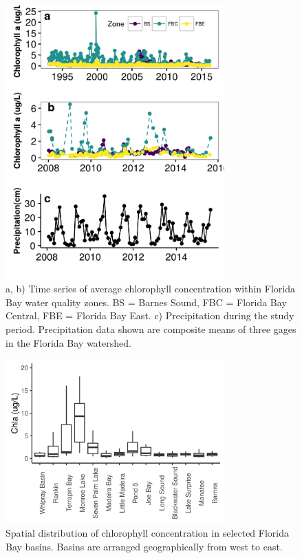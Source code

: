 \newpage

\begin{figure}
  \centering
  \includegraphics[width=0.75\textwidth]{../../figures/chltimeseries.png}
  \caption{a, b) Time series of average chlorophyll concentration within Florida Bay water quality zones. BS = Barnes Sound, FBC = Florida Bay Central, FBE = Florida Bay East. c) Precipitation during the study period. Precipitation data shown are composite means of three gages in the Florida Bay watershed.}
  \label{fig:2}
\end{figure}

\newpage

\begin{figure}
  \centering
  \includegraphics[width=0.75\textwidth]{../../figures/chlboxplot.png}
  \caption{Spatial distribution of chlorophyll concentration in selected Florida Bay basins. Basins are arranged geographically from west to east.}
  \label{fig:3}
\end{figure}

